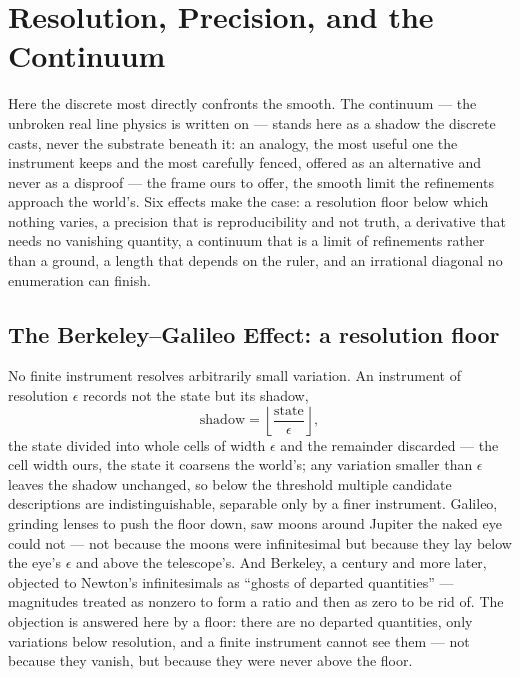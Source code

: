 \chapter{Resolution, Precision, and the Continuum}
\label{chap:resolution-precision-continuum}

Here the discrete most directly confronts the smooth. The continuum --- the unbroken real line physics is
written on --- stands here as a shadow the discrete casts, never the substrate beneath it: an analogy, the most
useful one the instrument keeps and the most carefully fenced, offered as an alternative and never as a
disproof --- the frame ours to offer, the smooth limit the refinements approach the world's. Six effects make
the case: a resolution floor below which nothing varies, a precision that is reproducibility and not truth, a
derivative that needs no vanishing quantity, a continuum that is a limit of refinements rather than a ground, a
length that depends on the ruler, and an irrational diagonal no enumeration can finish.

\section{The Berkeley--Galileo Effect: a resolution floor}
\label{se:berkeley-galileo}

No finite instrument resolves arbitrarily small variation. An instrument of resolution $\epsilon$ records not
the state but its shadow,
\begin{equation}
  \text{shadow} = \left\lfloor \frac{\text{state}}{\epsilon} \right\rfloor,
\end{equation}
the state divided into whole cells of width $\epsilon$ and the remainder discarded --- the cell width ours, the
state it coarsens the world's; any variation smaller than
$\epsilon$ leaves the shadow unchanged, so below the threshold multiple candidate descriptions are
indistinguishable, separable only by a finer instrument. Galileo, grinding lenses to push the floor down, saw
moons around Jupiter the naked eye could not --- not because the moons were infinitesimal but because they lay
below the eye's $\epsilon$ and above the telescope's. And Berkeley, a century and more later, objected to Newton's
infinitesimals as ``ghosts of departed quantities'' --- magnitudes treated as nonzero to form a ratio and then
as zero to be rid of. The objection is answered here by a floor: there are no departed quantities, only
variations below resolution, and a finite instrument cannot see them --- not because they vanish, but because
they were never above the floor.


